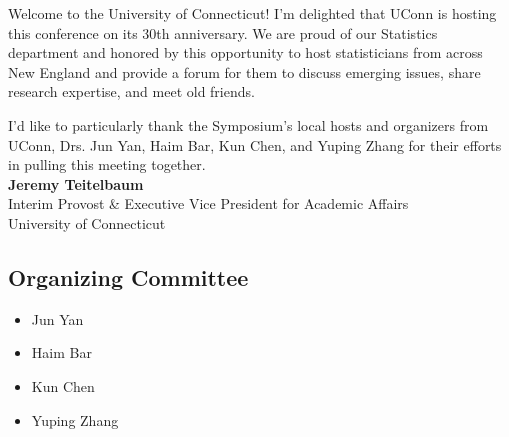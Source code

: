 
Welcome to the University of Connecticut!  I’m delighted that UConn is
hosting this conference on its 30th anniversary.  We are proud of our
Statistics department and honored by this opportunity to host
statisticians from across New England and provide a forum for them to
discuss emerging issues, share research expertise, and meet old
friends.
 
I’d like to particularly thank the Symposium’s local hosts and
organizers from UConn, Drs. Jun Yan, Haim Bar, Kun Chen, and Yuping
Zhang for their efforts in pulling this meeting together. \\[1em]

\textbf{Jeremy Teitelbaum} \\
Interim Provost \& Executive Vice President for Academic Affairs \\
University of Connecticut \\[1em]

\hrulefill

\subsection*{Organizing Committee}

\begin{itemize}
\item Jun Yan
\item Haim Bar
\item Kun Chen
\item Yuping Zhang
\end{itemize}

